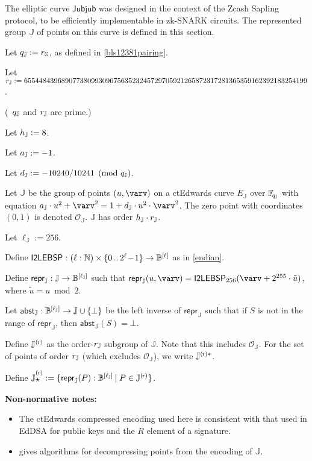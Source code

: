 \documentclass{article}
\newcommand{\crossref}[1]{\autoref{#1}}
\newcommand{\callout}[1]{\vspace{2ex plus 2pt minus 2pt}\noindent\textbf{#1}\hspace{1em}}
\newenvironment{nnotes}{\callout{Non-normative notes:}\begin{itemize}}{\end{itemize}}
\newcommand{\typecolon}{:}
\newcommand{\hairspace}{~\!}
\newcommand{\bit}{\mathbb{B}}
\newcommand{\Nat}{\mathbb{N}}
\newcommand{\Field}[1]{\mathbb{F}_{\!#1}}
\newcommand{\typeexp}[2]{{#1}\vphantom{)}^{[{#2}]}}
\newcommand{\bitseq}[1]{\typeexp{\bit}{#1}}
\newcommand{\setof}[1]{\{{#1}\}}
\newcommand{\barerange}[2]{{{#1}\,..\,{#2}}}
\newcommand{\range}[2]{\setof{\barerange{#1}{#2}}}
\newcommand{\binaryrange}[1]{\range{0}{2^{#1}\!-\!1}}
\newcommand{\mult}{\cdot}
\newcommand{\union}{\cup}
\newcommand{\suchthat}{\,\vert\;}
\newcommand{\maybe}[1]{{#1} \union \setof{\bot}}
\newcommand{\Repr}{\star}
\newcommand{\MakeRepr}[2]{{#1}\rlap{\raisebox{-0.32ex}{$\Repr$}}\rule{0ex}{2.2ex}^{#2}}
\newcommand{\Curve}{E}
\newcommand{\Zero}{\mathcal{O}}
\newcommand{\subgroupr}{(\kern-0.075emr\kern-0.075em)}
\newcommand{\ParamS}[1]{{{#1}_\mathbb{\hskip 0.03em S}}}
\newcommand{\ParamJ}[1]{{{#1}_\mathbb{\hskip 0.01em J}}}
\newcommand{\GroupJ}{\mathbb{J}}
\newcommand{\SubgroupJ}{\GroupJ^{\subgroupr}}
\newcommand{\SubgroupJstar}{\GroupJ^{\subgroupr\ast}}
\newcommand{\SubgroupReprJ}{\MakeRepr{\GroupJ}{\subgroupr}}
\newcommand{\CurveJ}{\Curve_{\GroupJ}}
\newcommand{\ZeroJ}{\Zero_{\GroupJ}}
\newcommand{\ellJ}{\ell_{\GroupJ}}
\newcommand{\ReprJ}{\bitseq{\ellJ}}
\newcommand{\reprJ}{\repr_{\GroupJ}}
\newcommand{\abstJ}{\abst_{\GroupJ}}
\newcommand{\JubjubCurve}{\mathsf{Jubjub}}
\newcommand{\repr}{\mathsf{repr}}
\newcommand{\abst}{\mathsf{abst}}
\newcommand{\ItoLEBSP}[1]{\mathsf{I2LEBSP}_{#1}}
\begin{document}
The elliptic curve $\JubjubCurve$ was designed in the context of the Zcash Sapling protocol,
to be efficiently implementable in zk-SNARK circuits. The represented group $\GroupJ$ of points
on this curve is defined in this section.


Let $\ParamJ{q} := \ParamS{r}$, as defined in \crossref{bls12381pairing}.

Let $\ParamJ{r} := 6554484396890773809930967563523245729705921265872317281365359162392183254199$.

(\hairspace $\ParamJ{q}$ and $\ParamJ{r}$ are prime.)

Let $\ParamJ{h} := 8$.

Let $\ParamJ{a} := -1$.

Let $\ParamJ{d} := -10240/10241 \pmod{\ParamJ{q}}$.

Let $\GroupJ$ be the group of points $(u, \varv)$ on a ctEdwards curve $\CurveJ$ over $\Field{\ParamJ{q}}$
with equation $\ParamJ{a} \mult u^2 + \varv^2 = 1 + \ParamJ{d} \mult u^2 \mult \varv^2$.
The zero point with coordinates $(0, 1)$ is denoted $\ZeroJ$.
$\GroupJ$ has order $\ParamJ{h} \mult \ParamJ{r}$.

Let $\ellJ := 256$.

Define $\ItoLEBSP{} \typecolon (\ell \typecolon \Nat) \times \binaryrange{\ell} \rightarrow \bitseq{\ell}$
as in \crossref{endian}.

Define $\reprJ \typecolon \GroupJ \rightarrow \ReprJ$ such
that $\reprJ(u, \varv) = \ItoLEBSP{256}(\varv + 2^{255} \mult \tilde{u})$, where
$\tilde{u} = u \bmod 2$.

Let $\abstJ \typecolon \ReprJ \rightarrow \maybe{\GroupJ}$
be the left inverse of $\reprJ$ such that if $S$ is not in the range of
$\reprJ$, then $\abstJ(S) = \bot$.

Define $\SubgroupJ$ as the order-$\ParamJ{r}$ subgroup of $\GroupJ$. Note that this includes $\ZeroJ$.
For the set of points of order $\ParamJ{r}$ (which excludes $\ZeroJ$), we write $\SubgroupJstar$.

Define $\SubgroupReprJ := \setof{\reprJ(P) \typecolon \ReprJ \suchthat P \in \SubgroupJ}$.

\begin{nnotes}
  \item The ctEdwards compressed encoding used here is
        consistent with that used in EdDSA \cite{BJLSY2015} for public keys and
        the $R$ element of a signature.
  \item \cite[``Encoding and parsing curve points'']{BJLSY2015} gives algorithms
        for decompressing points from the encoding of $\GroupJ$.
\end{nnotes}
\end{document}
